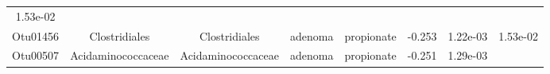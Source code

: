 \documentclass[11pt,]{article}
\begin{document}
\begin{longtable}[]{@{}cccccccc@{}}
\begin{minipage}[t]{0.08\columnwidth}
1.53e-02\strut
\end{minipage}\tabularnewline
\begin{minipage}[t]{0.08\columnwidth}\centering\strut
Otu01456\strut
\end{minipage} & \begin{minipage}[t]{0.15\columnwidth}\centering\strut
Clostridiales\strut
\end{minipage} & \begin{minipage}[t]{0.15\columnwidth}\centering\strut
Clostridiales\strut
\end{minipage} & \begin{minipage}[t]{0.08\columnwidth}\centering\strut
adenoma\strut
\end{minipage} & \begin{minipage}[t]{0.09\columnwidth}\centering\strut
propionate\strut
\end{minipage} & \begin{minipage}[t]{0.07\columnwidth}\centering\strut
-0.253\strut
\end{minipage} & \begin{minipage}[t]{0.08\columnwidth}\centering\strut
1.22e-03\strut
\end{minipage} & \begin{minipage}[t]{0.08\columnwidth}\centering\strut
1.53e-02\strut
\end{minipage}\tabularnewline
\begin{minipage}[t]{0.08\columnwidth}\centering\strut
Otu00507\strut
\end{minipage} & \begin{minipage}[t]{0.15\columnwidth}\centering\strut
Acidaminococcaceae\strut
\end{minipage} & \begin{minipage}[t]{0.15\columnwidth}\centering\strut
Acidaminococcaceae\strut
\end{minipage} & \begin{minipage}[t]{0.08\columnwidth}\centering\strut
adenoma\strut
\end{minipage} & \begin{minipage}[t]{0.09\columnwidth}\centering\strut
propionate\strut
\end{minipage} & \begin{minipage}[t]{0.07\columnwidth}\centering\strut
-0.251\strut
\end{minipage} & \begin{minipage}[t]{0.08\columnwidth}\centering\strut
1.29e-03\strut
\end{minipage} & \begin{minipage}[t]{0.08\columnwidth}\centering\strut

\end{minipage}
\end{longtable}
\end{document}
